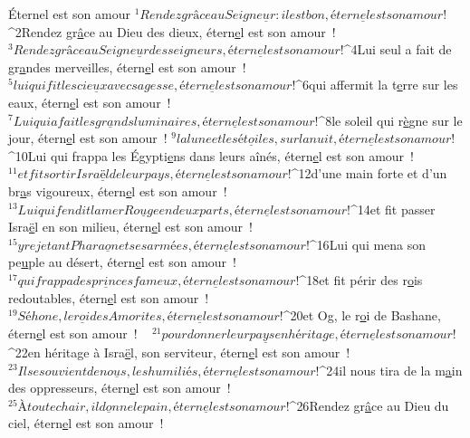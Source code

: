             Éternel est son amour
${}^{1}Rendez grâce au Seigne\underline{u}r : il est bon,
        étern\underline{e}l est son amour !
${}^{2}Rendez gr\underline{â}ce au Dieu des dieux,
        étern\underline{e}l est son amour !
${}^{3}Rendez grâce au Seigne\underline{u}r des seigneurs,
        étern\underline{e}l est son amour !
         
${}^{4}Lui seul a fait de gr\underline{a}ndes merveilles,
        étern\underline{e}l est son amour !
${}^{5}lui qui fit les cie\underline{u}x avec sagesse,
        étern\underline{e}l est son amour !
${}^{6}qui affermit la t\underline{e}rre sur les eaux,
        étern\underline{e}l est son amour !
         
${}^{7}Lui qui a fait les gr\underline{a}nds luminaires,
        étern\underline{e}l est son amour !
${}^{8}le soleil qui r\underline{è}gne sur le jour,
        étern\underline{e}l est son amour !
${}^{9}la lune et les ét\underline{o}iles, sur la nuit,
        étern\underline{e}l est son amour !
         
${}^{10}Lui qui frappa les Égypti\underline{e}ns dans leurs aînés,
        étern\underline{e}l est son amour !
${}^{11}et fit sortir Isra\underline{ë}l de leur pays,
        étern\underline{e}l est son amour !
${}^{12}d’une main forte et d’un br\underline{a}s vigoureux,
        étern\underline{e}l est son amour !
         
${}^{13}Lui qui fendit la mer Ro\underline{u}ge en deux parts,
        étern\underline{e}l est son amour !
${}^{14}et fit passer Isra\underline{ë}l en son milieu,
        étern\underline{e}l est son amour !
${}^{15}y rejetant Phara\underline{o}n et ses armées,
        étern\underline{e}l est son amour !
         
${}^{16}Lui qui mena son pe\underline{u}ple au désert,
        étern\underline{e}l est son amour !
${}^{17}qui frappa des pr\underline{i}nces fameux,
        étern\underline{e}l est son amour !
${}^{18}et fit périr des r\underline{o}is redoutables,
        étern\underline{e}l est son amour !
         
${}^{19}Séhone, le r\underline{o}i des Amorites,
        étern\underline{e}l est son amour !
${}^{20}et Og, le r\underline{o}i de Bashane,
        étern\underline{e}l est son amour !
         
${}^{21}pour donner leur pa\underline{y}s en héritage,
        étern\underline{e}l est son amour !
${}^{22}en héritage à Isra\underline{ë}l, son serviteur,
        étern\underline{e}l est son amour !
         
${}^{23}Il se souvient de no\underline{u}s, les humiliés,
        étern\underline{e}l est son amour !
${}^{24}il nous tira de la m\underline{a}in des oppresseurs,
        étern\underline{e}l est son amour !
         
${}^{25}À toute chair, il d\underline{o}nne le pain,
        étern\underline{e}l est son amour !
${}^{26}Rendez gr\underline{â}ce au Dieu du ciel,
        étern\underline{e}l est son amour !
          
